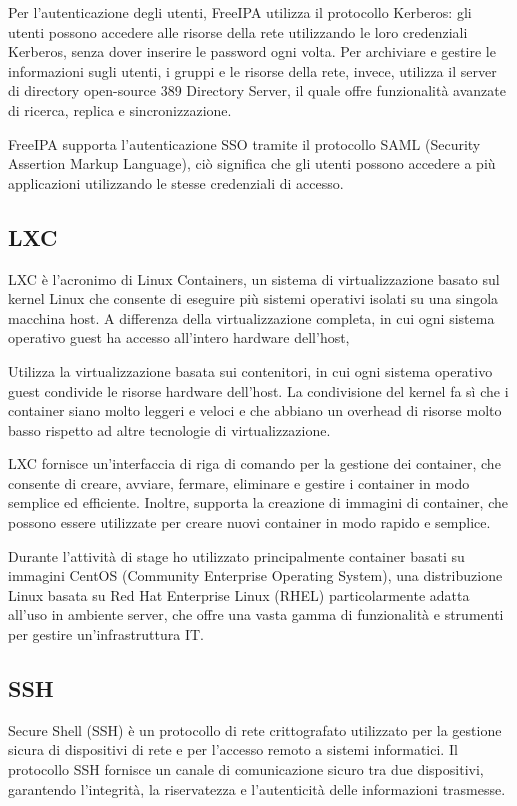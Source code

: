 Per l'autenticazione degli utenti, FreeIPA utilizza il protocollo Kerberos: gli utenti possono accedere alle risorse della rete utilizzando le loro credenziali Kerberos, senza dover inserire le password ogni volta.
Per archiviare e gestire le informazioni sugli utenti, i gruppi e le risorse della rete, invece, utilizza il server di directory open-source 389 Directory Server, il quale offre funzionalità avanzate di ricerca, replica e sincronizzazione.

FreeIPA supporta l'autenticazione SSO tramite il protocollo SAML (Security Assertion Markup Language), ciò significa che gli utenti possono accedere a più applicazioni utilizzando le stesse credenziali di accesso.

\subsection{LXC}
LXC è l'acronimo di Linux Containers, un sistema di virtualizzazione basato sul kernel Linux che consente di eseguire più sistemi operativi isolati su una singola macchina host. A differenza della virtualizzazione completa, in cui ogni sistema operativo guest ha accesso all'intero hardware dell'host, 

Utilizza la virtualizzazione basata sui contenitori, in cui ogni sistema operativo guest condivide le risorse hardware dell'host.
La condivisione del kernel fa sì che i container siano molto leggeri e veloci e che abbiano un overhead di risorse molto basso rispetto ad altre tecnologie di virtualizzazione.

LXC fornisce un'interfaccia di riga di comando per la gestione dei container, che consente di creare, avviare, fermare, eliminare e gestire i container in modo semplice ed efficiente. Inoltre, supporta la creazione di immagini di container, che possono essere utilizzate per creare nuovi container in modo rapido e semplice.

Durante l'attività di stage ho utilizzato principalmente container basati su immagini CentOS (Community Enterprise Operating System), una distribuzione Linux basata su Red Hat Enterprise Linux (RHEL) particolarmente adatta all'uso in ambiente server, che offre una vasta gamma di funzionalità e strumenti per gestire un'infrastruttura IT.

\subsection{SSH}
Secure Shell (SSH) è un protocollo di rete crittografato utilizzato per la gestione sicura di dispositivi di rete e per l'accesso remoto a sistemi informatici. Il protocollo SSH fornisce un canale di comunicazione sicuro tra due dispositivi, garantendo l'integrità, la riservatezza e l'autenticità delle informazioni trasmesse.

